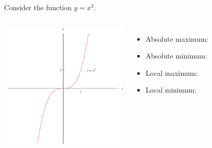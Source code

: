 \begin{frame}
\begin{example}[Example 3, p. 263]
Consider the function $y = x^3$.
\begin{columns}[c]
\ \includegraphics[width=6cm]{maxima-minima/pictures/01-02-xcubed.pdf}%
\begin{itemize}
\item<1-| alert@2-3>  Absolute maximum: \uncover<3->{None}
\item<1-| alert@4-5>  Absolute minimum: 
\item<1-| alert@6-7>  Local maximum: 
\item<1-| alert@8-9>  Local minimum: 
\end{itemize}
\end{columns}
\end{example}
\end{frame}
